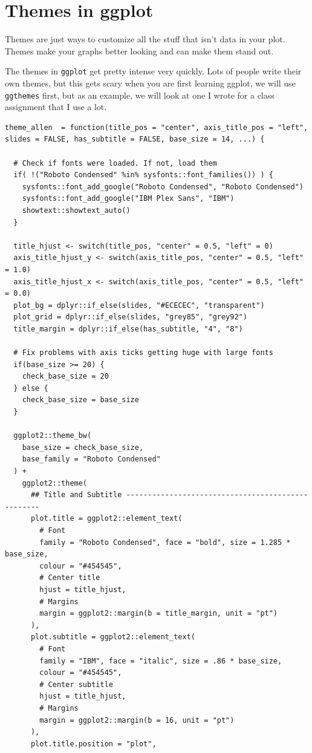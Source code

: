 \documentclass[]{tufte-handout}
\begin{document}
\hypertarget{themes-in-ggplot}{%
\section{Themes in ggplot}\label{themes-in-ggplot}}

Themes are just ways to customize all the stuff that isn't data in your
plot. Themes make your graphs better looking and can make them stand
out.

The themes in \texttt{ggplot} get pretty intense very quickly. Lots of
people write their own themes, but this gets scary when you are first
learning ggplot, we will use \texttt{ggthemes} first, but as an example,
we will look at one I wrote for a class assignment that I use a lot.

\begin{verbatim}
theme_allen  = function(title_pos = "center", axis_title_pos = "left", slides = FALSE, has_subtitle = FALSE, base_size = 14, ...) {
  
  # Check if fonts were loaded. If not, load them
  if( !("Roboto Condensed" %in% sysfonts::font_families()) ) {
    sysfonts::font_add_google("Roboto Condensed", "Roboto Condensed")
    sysfonts::font_add_google("IBM Plex Sans", "IBM")
    showtext::showtext_auto()
  }
  
  title_hjust <- switch(title_pos, "center" = 0.5, "left" = 0)
  axis_title_hjust_y <- switch(axis_title_pos, "center" = 0.5, "left" = 1.0)
  axis_title_hjust_x <- switch(axis_title_pos, "center" = 0.5, "left" = 0.0)
  plot_bg = dplyr::if_else(slides, "#ECECEC", "transparent")
  plot_grid = dplyr::if_else(slides, "grey85", "grey92")
  title_margin = dplyr::if_else(has_subtitle, "4", "8")
  
  # Fix problems with axis ticks getting huge with large fonts
  if(base_size >= 20) {
    check_base_size = 20
  } else {
    check_base_size = base_size
  }
  
  ggplot2::theme_bw(
    base_size = check_base_size,
    base_family = "Roboto Condensed"
  ) +
    ggplot2::theme(
      ## Title and Subtitle --------------------------------------------------
      plot.title = ggplot2::element_text(
        # Font
        family = "Roboto Condensed", face = "bold", size = 1.285 * base_size,
        colour = "#454545",
        # Center title
        hjust = title_hjust,
        # Margins
        margin = ggplot2::margin(b = title_margin, unit = "pt")
      ),
      plot.subtitle = ggplot2::element_text(
        # Font
        family = "IBM", face = "italic", size = .86 * base_size,
        colour = "#454545",
        # Center subtitle
        hjust = title_hjust,
        # Margins
        margin = ggplot2::margin(b = 16, unit = "pt")
      ),
      plot.title.position = "plot",
      

\end{verbatim}
\end{document}
